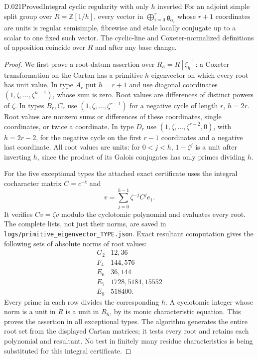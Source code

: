 \begin{saresult}{D.021}{Proved}{Integral cyclic regularity with only $h$ inverted}
For an adjoint simple split group over $R=\mathbb Z[1/h]$,
every vector in
$\bigoplus_{i=0}^r\mathfrak g_{\alpha_i}$ whose $r+1$
coordinates are units is regular semisimple, fibrewise and
etale locally conjugate up to a scalar to one fixed such
vector.  The cyclic-line and Coxeter-normalized definitions
of apposition coincide over $R$ and after any base change.
\end{saresult}
\begin{proof}
We first prove a root-datum assertion over
$R_h=R[\zeta_h]$: a Coxeter transformation on the Cartan
has a primitive-$h$ eigenvector on which every root has
unit value.  In type $A_r$ put $h=r+1$ and use diagonal
coordinates $(1,\zeta,\ldots,\zeta^{h-1})$, whose sum
is zero.  Root values are differences of distinct
powers of $\zeta$.  In types $B_r,C_r$ use
$(1,\zeta,\ldots,\zeta^{r-1})$ for a negative cycle
of length $r$, $h=2r$.  Root values are nonzero sums
or differences of these coordinates, single coordinates,
or twice a coordinate.  In type $D_r$ use
$(1,\zeta,\ldots,\zeta^{r-2},0)$, with $h=2r-2$,
for the negative cycle on the first $r-1$ coordinates
and a negative last coordinate.  All root values are
units: for $0<j<h$, $1-\zeta^j$ is a unit after
inverting $h$, since the product of its Galois
conjugates has only primes dividing $h$.

For the five exceptional types the attached exact
certificate uses the integral cocharacter matrix
$C=c^{-\mathsf t}$ and
\[
 v=\sum_{j=0}^{h-1}\zeta^{-j}C^j e_1.
\]
It verifies $Cv=\zeta v$ modulo the cyclotomic
polynomial and evaluates every root.  The complete
lists, not just their norms, are saved in
\texttt{logs/primitive\_eigenvector\_TYPE.json}.
Exact resultant computation gives the following sets
of absolute norms of root values:
\[
\begin{array}{c|l}
G_2&12,36\\
F_4&144,576\\
E_6&36,144\\
E_7&1728,5184,15552\\
E_8&518400.
\end{array}
\]
Every prime in each row divides the corresponding
$h$.  A cyclotomic integer whose norm is a unit in
$R$ is a unit in $R_h$, by its monic characteristic
equation.  This proves the assertion in all exceptional
types.  The algorithm generates the entire root set
from the displayed Cartan matrices; it tests every
root and retains each polynomial and resultant.
No test in finitely many residue characteristics is
being substituted for this integral certificate.


\end{proof}
